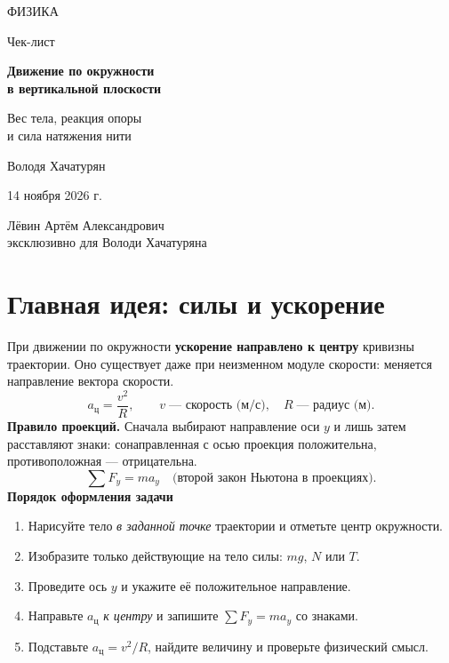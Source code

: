 \documentclass[a4paper,11pt]{article}
\newcommand{\acent}{a_{\text{ц}}}
\newcommand{\mysection}[1]{\section{#1}\vspace{-0.2em}}
\begin{document}
\thispagestyle{empty}
\begin{center}
\vspace*{1.5cm}
{\Large\color{darkaccent}ФИЗИКА}\par
\vspace{1.7cm}
{\LARGE Чек-лист}\par
\vspace{1.1cm}
{\Large\color{accent}\bfseries Движение по окружности\\[0.12cm]в вертикальной плоскости}\par
\vspace{1.3cm}
{\normalsize Вес тела, реакция опоры\\и сила натяжения нити}\par
\vfill
{\large Володя Хачатурян}\par
\vspace{0.65cm}
{\large 14 ноября 2026 г.}\par
\vspace{1.15cm}
{\small Лёвин Артём Александрович\\[2mm]эксклюзивно для Володи Хачатуряна}\par
\vspace{1.0cm}
\end{center}
\clearpage
\mysection{Главная идея: силы и ускорение}
При движении по окружности \textbf{ускорение направлено к центру} кривизны траектории. Оно существует даже при неизменном модуле скорости: меняется направление вектора скорости.
\[
\boxed{\acent=\frac{v^2}{R}},\qquad
v\;\text{--- скорость (м/с)},\quad R\;\text{--- радиус (м)}.
\]
\textcolor{darkaccent}{\textbf{Правило проекций.}} Сначала выбирают направление оси $y$ и лишь затем расставляют знаки: сонаправленная с осью проекция положительна, противоположная --- отрицательна.
\[
\boxed{\sum F_y=ma_y}\quad\text{(второй закон Ньютона в проекциях).}
\]
\textcolor{darkaccent}{\textbf{Порядок оформления задачи}}
\begin{enumerate}[label=\arabic*.]
\item Нарисуйте тело \textit{в заданной точке} траектории и отметьте центр окружности.
\item Изобразите только действующие на тело силы: $mg$, $N$ или $T$.
\item Проведите ось $y$ и укажите её положительное направление.
\item Направьте $\acent$ \textit{к центру} и запишите $\sum F_y=ma_y$ со знаками.
\item Подставьте $\acent=v^2/R$, найдите величину и проверьте физический смысл.
\end{enumerate}
\end{document}
